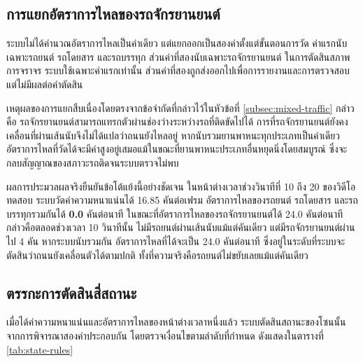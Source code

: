 \subsection{การแยกอัตราการไหลของรถจักรยานยนต์}
\label{subsec:motorcycle-split}

ระบบไม่ได้คำนวณอัตราการไหลเป็นค่าเดียว แต่แยกออกเป็นสองค่าตั้งแต่ขั้นตอนการวัด ค่าแรกนับเฉพาะรถยนต์ รถโดยสาร และรถบรรทุก ส่วนค่าที่สองนับเฉพาะรถจักรยานยนต์  ในการตัดสินสภาพการจราจร ระบบใช้เฉพาะค่าแรกเท่านั้น ส่วนค่าที่สองถูกส่งออกไปเพื่อการรายงานและการตรวจสอบ แต่ไม่มีผลต่อคำตัดสิน

เหตุผลของการแยกสืบเนื่องโดยตรงจากข้อจำกัดที่กล่าวไว้ในหัวข้อที่ \ref{subsec:mixed-traffic} กล่าวคือ รถจักรยานยนต์สามารถแทรกตัวผ่านช่องว่างระหว่างรถที่ติดขัดไปได้ การที่รถจักรยานยนต์ยังคงเคลื่อนที่ผ่านเส้นนับจึงไม่ได้แปลว่าถนนยังไหลอยู่  หากนับรวมยานพาหนะทุกประเภทเป็นค่าเดียว อัตราการไหลที่วัดได้จะมีค่าสูงอยู่เสมอแม้ในขณะที่ยานพาหนะประเภทอื่นหยุดนิ่งโดยสมบูรณ์ ซึ่งจะกลบสัญญาณของสภาวะรถติดจนระบบตรวจไม่พบ

ผลการประมวลผลจริงยืนยันข้อโต้แย้งนี้อย่างชัดเจน ในหน้าต่างเวลาช่วงวินาทีที่ 10 ถึง 20 ของวิดีโอทดสอบ ระบบวัดค่าความหนาแน่นได้ 16.85 คันต่อเฟรม อัตราการไหลของรถยนต์ รถโดยสาร และรถบรรทุกรวมกันได้ \textbf{0.0} คันต่อนาที ในขณะที่อัตราการไหลของรถจักรยานยนต์ได้ 24.0 คันต่อนาที  กล่าวคือตลอดช่วงเวลา 10 วินาทีนั้น ไม่มีรถยนต์ผ่านเส้นนับแม้แต่คันเดียว แต่มีรถจักรยานยนต์ผ่านไป 4 คัน  หากระบบนับรวมกัน อัตราการไหลที่ได้จะเป็น 24.0 คันต่อนาที ซึ่งอยู่ในระดับที่ระบบจะตัดสินว่าถนนยังเคลื่อนตัวได้ตามปกติ ทั้งที่ความจริงคือรถยนต์ไม่ขยับเลยแม้แต่คันเดียว

\subsection{ตรรกะการตัดสินสี่สถานะ}
\label{subsec:state-rules}

เมื่อได้ค่าความหนาแน่นและอัตราการไหลของหน้าต่างเวลาหนึ่งแล้ว ระบบตัดสินสถานะของโซนนั้นจากการพิจารณาสองค่าประกอบกัน โดยตรวจเงื่อนไขตามลำดับที่กำหนด ดังแสดงในตารางที่ \ref{tab:state-rules}

